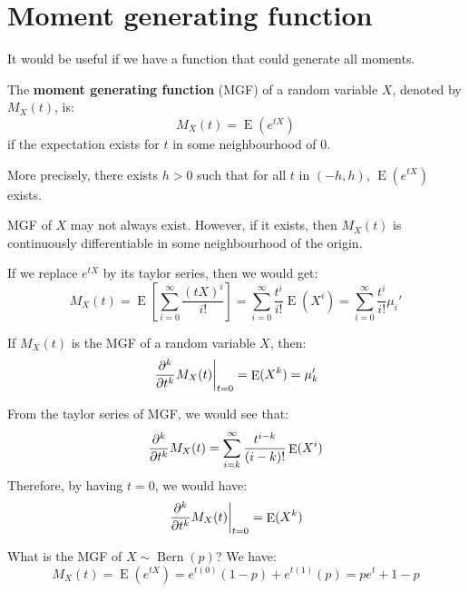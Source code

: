 \documentclass{huhtakm-template-book-v2}
\DeclareMathOperator{\E}{E}
\DeclareMathOperator{\Bern}{Bern}
\begin{document}
\section{Moment generating function}
It would be useful if we have a function that could generate all moments.
\begin{defn}
	The \textbf{moment generating function} (MGF) of a random variable $X$, denoted by $M_{X}(t)$, is:
	\begin{equation*}
		M_{X}(t)=\E(e^{tX})
	\end{equation*}
	if the expectation exists for $t$ in some neighbourhood of $0$.
\end{defn}
\begin{rem}
	More precisely, there exists $h>0$ such that for all $t$ in $(-h,h)$, $\E(e^{tX})$ exists.
\end{rem}
\begin{rem}
	MGF of $X$ may not always exist. However, if it exists, then $M_{X}(t)$ is continuously differentiable in some neighbourhood of the origin.
\end{rem}
\begin{rem}
	If we replace $e^{tX}$ by its taylor series, then we would get:
	\begin{equation*}
		M_{X}(t)=\E\left[\sum_{i=0}^{\infty}\frac{(tX)^{i}}{i!}\right]=\sum_{i=0}^{\infty}\frac{t^{i}}{i!}\E(X^{i})=\sum_{i=0}^{\infty}\frac{t^{i}}{i!}\mu_{i}'
	\end{equation*}
\end{rem}
\begin{lem}
	If $M_{X}(t)$ is the MGF of a random variable $X$, then:
	\begin{equation*}
		\left.\pdv*[order={k}]{M_{X}(t)}{t}\right|_{t=0}=\E(X^{k})=\mu_{k}'
	\end{equation*}
\end{lem}
\begin{proofing}
	From the taylor series of MGF, we would see that:
	\begin{equation*}
		\pdv*[order={k}]{M_{X}(t)}{t}=\sum_{i=k}^{\infty}\frac{t^{i-k}}{(i-k)!}\E(X^{i})
	\end{equation*}
	Therefore, by having $t=0$, we would have:
	\begin{equation*}
		\left.\pdv*[order={k}]{M_{X}(t)}{t}\right|_{t=0}=\E(X^{k})
	\end{equation*}
\end{proofing}
\begin{eg}
	What is the MGF of $X\sim\Bern(p)$? We have:
	\begin{equation*}
		M_{X}(t)=\E(e^{tX})=e^{t(0)}(1-p)+e^{t(1)}(p)=pe^{t}+1-p
	\end{equation*}
\end{eg}
\end{document}
